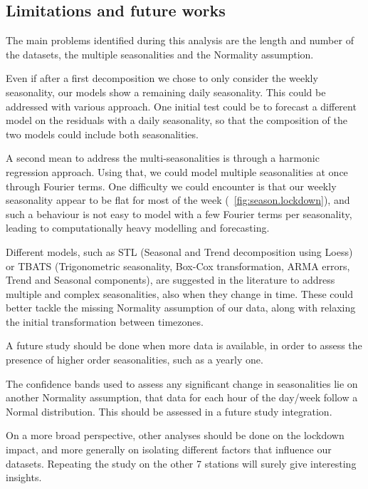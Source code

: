 \documentclass[12pt]{article}
\begin{document}
\subsection{Limitations and future works}
The main problems identified during this analysis are the length and number of the datasets, the multiple seasonalities and the Normality assumption.

Even if after a first decomposition we chose to only consider the weekly seasonality, our models show a remaining daily seasonality. This could be addressed with various approach. One initial test could be to forecast a different model on the residuals with a daily seasonality, so that the composition of the two models could include both seasonalities.

A second mean to address the multi-seasonalities is through a harmonic regression approach. Using that, we could model multiple seasonalities at once through Fourier terms. One difficulty we could encounter is that our weekly seasonality appear to be flat for most of the week (\figurename~\ref{fig:season.lockdown}), and such a behaviour is not easy to model with a few Fourier terms per seasonality, leading to computationally heavy modelling and forecasting.

Different models, such as STL (Seasonal and Trend decomposition using Loess) or TBATS (Trigonometric seasonality, Box-Cox transformation, ARMA errors, Trend and Seasonal components), are suggested in the literature \cite[chapter 12]{hyndman2018forecasting} to address multiple and complex seasonalities, also when they change in time. These could better tackle the missing Normality assumption of our data, along with relaxing the initial transformation between timezones.

A future study should be done when more data is available, in order to assess the presence of higher order seasonalities, such as a yearly one.

The confidence bands used to assess any significant change in seasonalities lie on another Normality assumption, that data for each hour of the day/week follow a Normal distribution. This should be assessed in a future study integration.

On a more broad perspective, other analyses should be done on the lockdown impact, and more generally on isolating different factors that influence our datasets. Repeating the study on the other 7 stations will surely give interesting insights.


\end{document}
